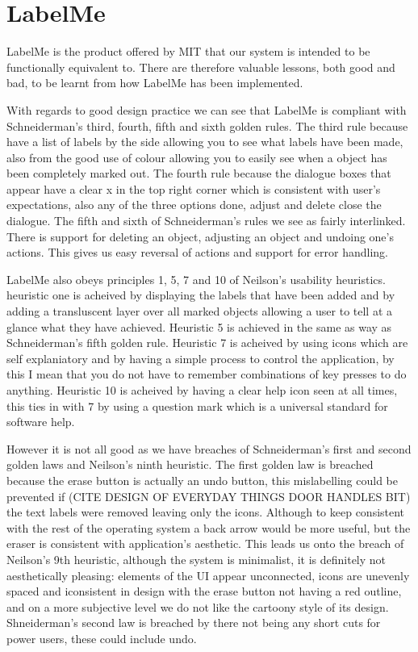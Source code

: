 \documentclass[a4paper,11pt,oneside]{article}
\begin{document}
\section{LabelMe}
LabelMe is the product offered by MIT that our system is intended to be functionally equivalent to.  There are therefore valuable lessons, both good and bad, to be learnt from how LabelMe has been implemented.

With regards to good design practice we can see that LabelMe is compliant with Schneiderman's third, fourth, fifth and sixth golden rules.  The third rule because have a list of labels by the side allowing you to see what labels have been made, also from the good use of colour allowing you to easily see when a object has been completely marked out.  The fourth rule because the dialogue boxes that appear have a clear x in the top right corner which is consistent with user's expectations, also any of the three options done, adjust and delete close the dialogue.  The fifth and sixth of Schneiderman's rules we see as fairly interlinked.  There is support for deleting an object, adjusting an object and undoing one's actions.  This gives us easy reversal of actions and support for error handling.

LabelMe also obeys principles 1, 5, 7 and 10 of Neilson's usability heuristics.  heuristic one is acheived by displaying the labels that have been added and by adding a transluscent layer over all marked objects allowing a user to tell at a glance what they have achieved.  Heuristic 5 is achieved in the same as way as Schneiderman's fifth golden rule.  Heuristic 7 is acheived by using icons which are self explaniatory and by having a simple process to control the application, by this I mean that you do not have to remember combinations of key presses to do anything.  Heuristic 10 is acheived by having a clear help icon seen at all times, this ties in with 7 by using a question mark which is a universal standard for software help.

However it is not all good as we have breaches of Schneiderman's first and second golden laws and Neilson's ninth heuristic.  The first golden law is breached because the erase button is actually an undo button, this mislabelling could be prevented if (CITE DESIGN OF EVERYDAY THINGS DOOR HANDLES BIT) the text labels were removed leaving only the icons.  Although to keep consistent with the rest of the operating system a back arrow would be more useful, but the eraser is consistent with application's aesthetic.  This leads us onto the breach of Neilson's 9th heuristic, although the system is minimalist, it is definitely not aesthetically pleasing: elements of the UI appear unconnected, icons are unevenly spaced and iconsistent in design with the erase button not having a red outline, and on a more subjective level we do not like the cartoony style of its design.  Shneiderman's second law is breached by there not being any short cuts for power users, these could include undo.
\end{document}
